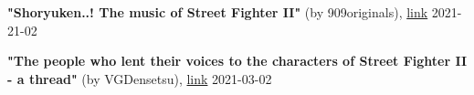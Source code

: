 \begin{thebibliography}{999}
  \textbf{"Shoryuken..! The music of Street Fighter II"} (by 909originals),
  \href{https://909originals.com/2021/02/21/shoryuken-the-music-of-street-fighter-ii-how-yoko-shimomura-soundtracked-one-of-the-biggest-video-games-of-all-time/}{link}
  2021-21-02

  \textbf{"The people who lent their voices to the characters of Street Fighter II - a thread"} (by VGDensetsu),
  \href{https://twitter.com/vgdensetsu/status/1357040620343328771?lang=en}{link}
  2021-03-02


\end{thebibliography}